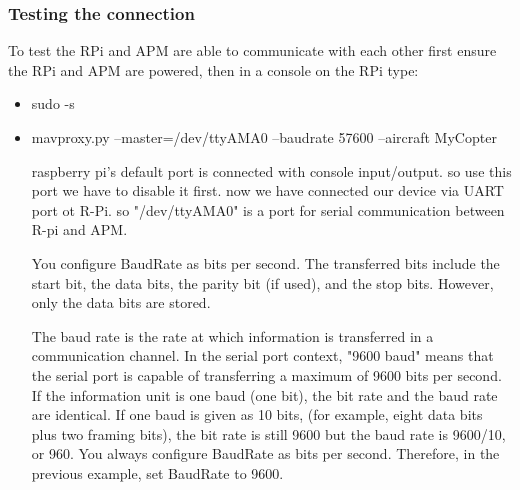 \documentclass[a4paper,12pt,oneside]{book}
\begin{document}
			\subsubsection{Testing the connection}
			To test the RPi and APM are able to communicate with each other first ensure the RPi and APM are powered, then in a console on the RPi type:
			\begin{itemize}
				\item sudo -s
				\item mavproxy.py --master=/dev/ttyAMA0 --baudrate 57600 --aircraft MyCopter
				
				raspberry pi's default port is connected with console input/output. so use this port we have to disable it first. now we have connected our device via UART port ot R-Pi. so "/dev/ttyAMA0" is a port for serial communication between R-pi and APM. 
				
				You configure BaudRate as bits per second. The transferred bits include the start bit, the data bits, the parity bit (if used), and the stop bits. However, only the data bits are stored.
				
				The baud rate is the rate at which information is transferred in a communication channel. In the serial port context, "9600 baud" means that the serial port is capable of transferring a maximum of 9600 bits per second. If the information unit is one baud (one bit), the bit rate and the baud rate are identical. If one baud is given as 10 bits, (for example, eight data bits plus two framing bits), the bit rate is still 9600 but the baud rate is 9600/10, or 960. You always configure BaudRate as bits per second. Therefore, in the previous example, set BaudRate to 9600.
				

\end{itemize}
\end{document}

